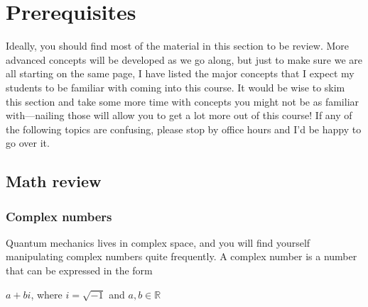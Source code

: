 %

%

\chapter{Prerequisites} \label{ch:prereq}
Ideally, you should find most of the material in this section to be review. More advanced concepts will be developed as we go along, but just to make sure we are all starting on the same page, I have listed the major concepts that I expect my students to be familiar with coming into this course. It would be wise to skim this section and take some more time with concepts you might not be as familiar with---nailing those will allow you to get a lot more out of this course! If any of the following topics are confusing, please stop by office hours and I'd be happy to go over it. \par 


\section{Math review} \label{sec:math}
\subsection{Complex numbers}
Quantum mechanics lives in complex space, and you will find yourself manipulating complex numbers quite frequently. A complex number is a number that can be expressed in the form 
\begin{tcolorbox}[title=Complex numbers]
$a + bi$, where $i = \sqrt{-1}$ and $a,b \in \mathbb{R}$
\end{tcolorbox}

